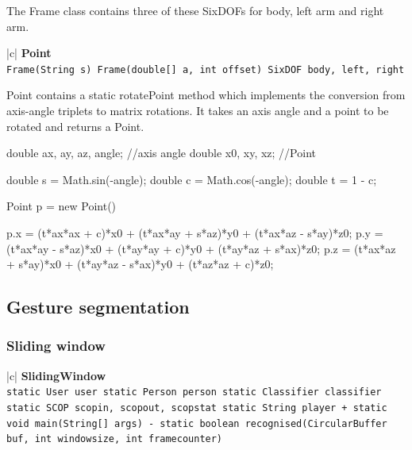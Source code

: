 \documentclass[12pt,a4,notitlepage]{report}
\renewcommand{\_}{\texttt{\symbol{95}}}
\newcommand{\<}{\texttt{\symbol{60}}}
\renewcommand{\>}{\texttt{\symbol{62}}}
\newcommand{\class}[1]{\textbf{#1}}
\newcommand{\variable}[1]{\texttt{#1}}
\begin{document}
{The Frame class contains three of these SixDOFs for body, left arm and right arm.

\begin{tabular}{|c|} \hline 
\class{Point} \\ \hline
{}
{\variable{Frame(String s) \newline
  Frame(double[] a, int offset)\newline
  SixDOF body, left, right 
} } \\ \hline
\end{tabular}

Point contains a static rotatePoint method which implements the conversion from axis-angle triplets to matrix rotations. It takes an axis angle and a point to be rotated and returns a Point.

\begin{code}
double ax, ay, az, angle; //axis angle
double x0, xy, xz; //Point

double s = Math.sin(-angle);
double c = Math.cos(-angle);
double t = 1 - c;

Point p = new Point()

p.x = (t*ax*ax + c)*x0 + (t*ax*ay + s*az)*y0 + (t*ax*az - s*ay)*z0;
p.y = (t*ax*ay - s*az)*x0 + (t*ay*ay + c)*y0 + (t*ay*az + s*ax)*z0;
p.z = (t*ax*az + s*ay)*x0 + (t*ay*az - s*ax)*y0 + (t*az*az + c)*z0;
\end{code}

\subsection{Gesture segmentation}

\subsubsection{Sliding window}

\begin{tabular}{|c|} \hline 
\class{SlidingWindow} \\ \hline
{}
{ \variable{static User user \newline
static Person person \newline
static Classifier classifier \newline
static SCOP scopin, scopout, scopstat \newline
static String player \newline
+ static void main(String[] args) \newline
- static boolean recognised(CircularBuffer buf, int windowsize,	int framecounter)
} } \\ \hline
\end{tabular}

}
\end{document}
